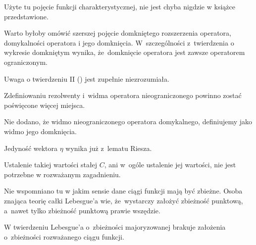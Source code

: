 \documentclass[a4paper,11pt]{article}
\numberwithin{equation}{section}
\begin{document}
\noindent
{} Użyte tu pojęcie funkcji charakterystycznej, nie jest
chyba nigdzie w książce przedstawione.

\VerSpaceFour





\noindent
{} Warto byłoby omówić szerszej pojęcie domkniętego rozszerzenia
operatora, domykalności operatora i jego domknięcia. W~szczególności
z~twierdzenia o wykresie domkniętym wynika, że~domknięcie operatora jest
zawsze operatorem ograniczonym.

\VerSpaceFour





\noindent
{} Uwaga o twierdzeniu II () jest zupełnie
niezrozumiała.

\VerSpaceFour





\noindent
{} Zdefiniowaniu rezolwenty i~widma operatora nieograniczonego powinno
zostać poświęcone więcej miejsca.

\VerSpaceFour





\noindent
{} Nie dodano, że widmo nieograniczonego operatora
domykalnego, definiujemy jako widmo jego domknięcia.

\VerSpaceFour





\noindent
{} Jedyność wektora $\eta$ wynika już z~lematu Riesza.

\VerSpaceFour





\noindent
{} Ustalenie takiej wartości stałej $C$, ani w~ogóle ustalenie jej
wartości, nie jest potrzebne w rozważanym zagadnieniu.

\VerSpaceFour





\noindent
{} Nie wspomniano tu w jakim sensie dane ciągi funkcji mają być
zbieżne. Osoba znająca teorię całki Lebesgue’a wie, że~wystarczy założyć
zbieżność punktową, a~nawet tylko zbieżność punktową prawie wszędzie.

\VerSpaceFour





\noindent
{} W twierdzeniu Lebesgue’a o~zbieżności majoryzowanej
brakuje założenia o~zbieżności rozważanego ciągu funkcji.
\end{document}

